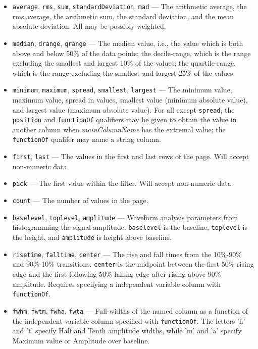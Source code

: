 \begin{itemize}
\begin{itemize}
\begin{itemize}
\begin{itemize}
\item {\tt average}, {\tt rms}, {\tt sum}, {\tt standardDeviation}, {\tt mad} --- The arithmetic average, 
the rms average, the arithmetic sum, the standard deviation, and the mean absolute deviation.  All may be possibly
weighted.
\item {\tt median}, {\tt drange}, {\tt qrange} --- The median value, i.e., the value which is both above and below
50\% of the data points; the decile-range, which is the range excluding the smallest and largest 10\% of the values;
the quartile-range, which is the range excluding the smallest and largest 25\% of the values.
\item {\tt minimum}, {\tt maximum}, {\tt spread}, {\tt smallest}, {\tt largest} --- 
The minimum value, maximum value, spread in values, smallest value (minimum absolute value), and largest value
(maximum absolute value).  For all except {\tt spread}, the {\tt position} and {\tt functionOf} qualifiers may be
given to obtain the value in another column when {\em mainColumnName} has the extremal value; the {\tt functionOf} qualifer may name a string column.

\item {\tt first}, {\tt last} --- The values in the first and last rows of the page.  Will accept non-numeric
data.
\item {\tt pick} --- The first value within the filter.  Will accept non-numeric data.
\item {\tt count} ---  The number of values in the page.
\item {\tt baselevel}, {\tt toplevel}, {\tt amplitude} --- Waveform analysis parameters from histogramming
the signal amplitude.  {\tt baselevel} is the baseline, {\tt toplevel} is the height, and {\tt amplitude}
is height above baseline.

\item {\tt risetime}, {\tt falltime}, {\tt center} --- The rise and fall times from the 10\%-90\% and
90\%-10\% transitions.  {\tt center} is the midpoint between the first 50\% rising edge and the first following 50\%
falling edge after rising above 90\% amplitude.  Requires specifying a independent variable column with {\tt
functionOf}.

\item {\tt fwhm}, {\tt fwtm}, {\tt fwha}, {\tt fwta} --- Full-widths of the named column as a function
of the independent variable column specified with {\tt functionOf}.  The letters 'h' and 't' specify Half and Tenth
amplitude widths, while 'm' and 'a' specify Maximum value or Amplitude over baseline.


\end{itemize}
\end{itemize}
\end{itemize}
\end{itemize}

